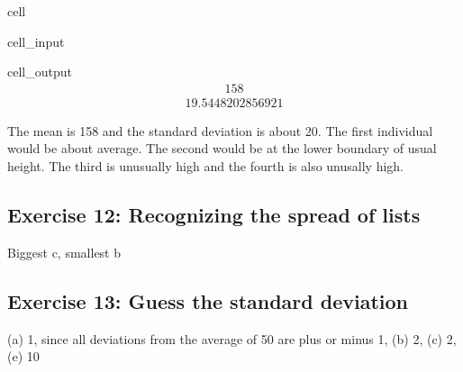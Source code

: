 \documentclass[letterpaper,10pt,english]{jupyterBook}
\begin{document}
\begin{sphinxuseclass}{cell}\begin{sphinxVerbatimInput}

\begin{sphinxuseclass}{cell_input}
\begin{sphinxVerbatim}[commandchars=\\\{\}]
\end{sphinxVerbatim}

\end{sphinxuseclass}\end{sphinxVerbatimInput}
\begin{sphinxVerbatimOutput}

\begin{sphinxuseclass}{cell_output}\begin{equation*}
\begin{split}158\end{split}
\end{equation*}\begin{equation*}
\begin{split}19.5448202856921\end{split}
\end{equation*}
\end{sphinxuseclass}\end{sphinxVerbatimOutput}

\end{sphinxuseclass}
\sphinxAtStartPar
The mean is 158 and the standard deviation is about 20. The first individual would be about average. The second would be at the lower boundary of usual height. The third is unusually high and the fourth is also unusally high.


\subsection{Exercise 12: Recognizing the spread of lists}
\label{\detokenize{exercises_unit_2:exercise-12-recognizing-the-spread-of-lists}}
\sphinxAtStartPar
Biggest c, smallest b


\subsection{Exercise 13: Guess the standard deviation}
\label{\detokenize{exercises_unit_2:exercise-13-guess-the-standard-deviation}}
\sphinxAtStartPar
(a) 1, since all deviations from the average of 50 are plus or minus 1, (b) 2, (c) 2, (e) 10
\end{document}
